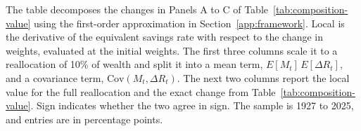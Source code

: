 \begin{table}[p]\centering
\caption{First-order decomposition of changes in asset class weights}\label{tab:composition-local}
\begin{minipage}{\linewidth}\small The table decomposes the changes in Panels A to C of Table~\ref{tab:composition-value} using the first-order approximation in Section~\ref{app:framework}. Local is the derivative of the equivalent savings rate with respect to the change in weights, evaluated at the initial weights. The first three columns scale it to a reallocation of 10\% of wealth and split it into a mean term, $E[M_t]\,E[\Delta R_t]$, and a covariance term, $\mathrm{Cov}(M_t,\Delta R_t)$. The next two columns report the local value for the full reallocation and the exact change from Table~\ref{tab:composition-value}. Sign indicates whether the two agree in sign. The sample is 1927 to 2025, and entries are in percentage points.\end{minipage}
\medskip


\end{table}

